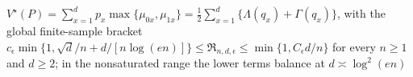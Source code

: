 \(V^\star(P)=\sum_{x=1}^dp_x\max\{\mu_{0x},\mu_{1x}\}=\frac12\sum_{x=1}^d\{\Lambda(q_x)+\Gamma(q_x)\}\), with the global finite-sample bracket \(c_\epsilon\min\{1,\sqrt d/n+d/[n\log(en)]\}\leq\mathfrak R_{n,d,\epsilon}\leq\min\{1,C_\epsilon d/n\}\) for every \(n\geq1\) and \(d\geq2\); in the nonsaturated range the lower terms balance at \(d\asymp\log^2(en)\)